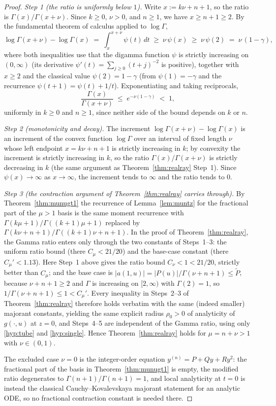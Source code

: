 \documentclass[11pt]{article}
\theoremstyle{definition}
\begin{document}
\begin{proof}
\emph{Step 1 (the ratio is uniformly below $1$).}
Write $x := k\nu + n + 1$, so the ratio is
$\Gamma(x)/\Gamma(x+\nu)$. Since $k \geq 0$, $\nu > 0$, and
$n \geq 1$, we have $x \geq n+1 \geq 2$. By the fundamental theorem
of calculus applied to $\log\Gamma$,
\[
\log\Gamma(x+\nu) - \log\Gamma(x)
\;=\; \int_{x}^{x+\nu} \psi(t)\,dt
\;\geq\; \nu\,\psi(x)
\;\geq\; \nu\,\psi(2)
\;=\; \nu\,(1-\gamma),
\]
where both inequalities use that the digamma function $\psi$ is
strictly increasing on $(0,\infty)$ (its derivative
$\psi'(t) = \sum_{j\geq 0} (t+j)^{-2}$ is positive), together with
$x \geq 2$ and the classical value $\psi(2) = 1-\gamma$ (from
$\psi(1) = -\gamma$ and the recurrence $\psi(t+1) = \psi(t) + 1/t$).
Exponentiating and taking reciprocals,
\[
\frac{\Gamma(x)}{\Gamma(x+\nu)} \;\leq\; e^{-\nu(1-\gamma)} \;<\; 1,
\]
uniformly in $k \geq 0$ and $n \geq 1$, since neither side of the
bound depends on $k$ or $n$.

\emph{Step 2 (monotonicity and decay).}
The increment $\log\Gamma(x+\nu) - \log\Gamma(x)$ is an increment of
the convex function $\log\Gamma$ over an interval of fixed length
$\nu$ whose left endpoint $x = k\nu+n+1$ is strictly increasing in
$k$; by convexity the increment is strictly increasing in $k$, so the
ratio $\Gamma(x)/\Gamma(x+\nu)$ is strictly decreasing in $k$ (the
same argument as Theorem~\ref{thm:realray} Step~1). Since
$\psi(x) \to \infty$ as $x \to \infty$, the increment tends to
$\infty$ and the ratio tends to $0$.

\emph{Step 3 (the contraction argument of Theorem~\ref{thm:realray}
carries through).}
By Theorem~\ref{thm:munugt1} the recurrence of
Lemma~\ref{lem:muntz} for the fractional part of the $\mu>1$ basis is
the same moment recurrence with
$\Gamma(k\mu+1)/\Gamma((k+1)\mu+1)$ replaced by
$\Gamma(k\nu+n+1)/\Gamma((k+1)\nu+n+1)$. In the proof of
Theorem~\ref{thm:realray}, the Gamma ratio enters only through the
two constants of Steps~1--3: the uniform ratio bound (there
$C_{\mu} < 21/20$) and the base-case constant (there
$C_{\mu}' < 1.13$). Here Step~1 above gives the ratio bound
$C_{\nu} < 1 < 21/20$, strictly better than $C_{\mu}$; and the base
case is $|a(1,u)| = |P(u)|/\Gamma(\nu+n+1) \leq \tilde P$, because
$\nu+n+1 \geq 2$ and $\Gamma$ is increasing on $[2,\infty)$ with
$\Gamma(2) = 1$, so $1/\Gamma(\nu+n+1) \leq 1 < C_{\mu}'$. Every
inequality in Steps~2--3 of Theorem~\ref{thm:realray} therefore holds
verbatim with the same (indeed smaller) majorant constants, yielding
the same explicit radius $\rho_{0} > 0$ of analyticity of
$g(\cdot,u)$ at $z=0$, and Steps~4--5 are independent of the Gamma
ratio, using only \ref{hyp:tube} and \ref{hyp:single}. Hence
Theorem~\ref{thm:realray} holds for $\mu = n+\nu > 1$ with
$\nu \in (0,1)$.

The excluded case $\nu = 0$ is the integer-order equation
$y^{(n)} = P + Qy + Ry^{2}$: the fractional part of the basis in
Theorem~\ref{thm:munugt1} is empty, the modified ratio degenerates to
$\Gamma(n+1)/\Gamma(n+1) = 1$, and local analyticity at $t=0$ is
instead the classical Cauchy--Kovalevskaya majorant statement for an
analytic ODE, so no fractional contraction constant is needed there.
\end{proof}
\end{document}
